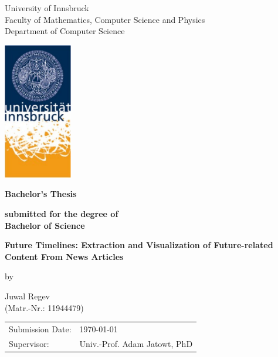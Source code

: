\documentclass[12pt,oneside,bibtotoc,liststotoc]{scrbook}
\begin{document}
\thispagestyle{empty}
\begin{center}
\LARGE{University of Innsbruck\\
Faculty of Mathematics, Computer Science and Physics}\\[3ex]
\large{Department of Computer Science}
\end{center}
\medskip

\begin{center}
\includegraphics[width=3cm]{Logo}
\vspace{1.5cm}

\textbf{\LARGE{Bachelor's Thesis}}
\medskip\par
\textbf{\normalsize{submitted for the degree of}} \\[3ex]
\textbf{\Large{Bachelor of Science}}
\vspace{2cm}

\textbf{\Large{Future Timelines: Extraction and Visualization of Future-related Content From News Articles}}
\bigskip\par
by \par
\large{Juwal Regev}\\
(Matr.-Nr.: 11944479)
\end{center}
\vspace{0.7cm}

\begin{tabular}{ll}
  Submission Date:  & \today \\
  Supervisor: & Univ.-Prof. Adam Jatowt, PhD \\
\end{tabular}

\newpage



\renewcommand{\baselinestretch}{1.00}\normalsize


\tableofcontents
\setcounter{page}{1}

\listoffigures
\renewcommand{\baselinestretch}{1.5}\normalsize
\end{document}
